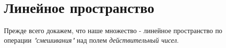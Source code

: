 \section*{Линейное пространство}
Прежде всего докажем, что наше множество - линейное пространство по операции \textit{"смешивания"} над полем \textit{действительный чисел}.




